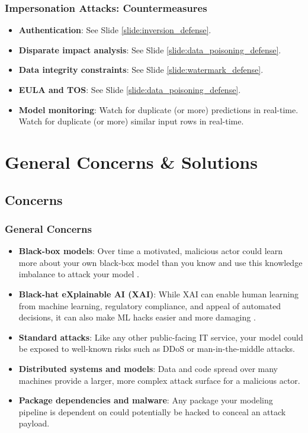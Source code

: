 \documentclass[11pt,
               aspectratio=169,
               hyperref={colorlinks}
               ]{beamer}
\begin{document}
			\begin{frame}
		
				\frametitle{Impersonation Attacks: \textbf{Countermeasures}}		
			
				\begin{itemize}
					\Large
					\item \textbf{Authentication}: See Slide \ref{slide:inversion_defense}. 
					\item \textbf{Disparate impact analysis}: See Slide \ref{slide:data_poisoning_defense}.
					\item \textbf{Data integrity constraints}: See Slide \ref{slide:watermark_defense}.
					\item \textbf{EULA and TOS}: See Slide \ref{slide:data_poisoning_defense}.
					\item \textbf{Model monitoring}: Watch for duplicate (or more) predictions in real-time. Watch for duplicate (or more) similar input rows in real-time.
				\end{itemize}
				
			\end{frame}

	\section{General Concerns \& Solutions}

		\subsection{Concerns}
			\begin{frame}[t, allowframebreaks]	
		
				\frametitle{General Concerns}	
				\footnotesize
				\begin{itemize}
					\item \textbf{Black-box models}: Over time a motivated, malicious actor could learn more about your own black-box model than you know and use this knowledge imbalance to attack your model \cite{papernot2018marauder}.
					\item \textbf{Black-hat eXplainable AI (XAI)}:  While XAI can enable human learning from machine learning, regulatory compliance, and appeal of automated decisions, it can also make ML hacks easier and more damaging \cite{shokri2019privacy}.
					\item \textbf{Standard attacks}: Like any other public-facing IT service, your model could be exposed to well-known risks such as DDoS or man-in-the-middle attacks.  
					\item \textbf{Distributed systems and models}: Data and code spread over many machines provide a larger, more complex attack surface for a malicious actor.
					\item \textbf{Package dependencies and malware}: Any package your modeling pipeline is dependent on could potentially be hacked to conceal an attack payload.
				\end{itemize}
				\normalsize

			\end{frame}
\end{document}
